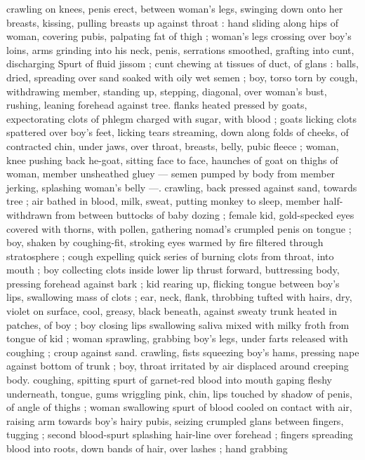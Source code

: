 crawling on knees, penis erect, between woman's legs, swinging
down onto her breasts, kissing, pulling breasts up against throat :
hand sliding along hips of woman, covering pubis, palpating fat of
thigh ; woman's legs crossing over boy's loins, arms grinding into his
neck, penis, serrations smoothed, grafting into cunt, discharging
Spurt of fluid jissom ; cunt chewing at tissues of duct, of glans :
balls, dried, spreading over sand soaked with oily wet semen ; boy,
torso torn by cough, withdrawing member, standing up, stepping,
diagonal, over woman's bust, rushing, leaning forehead against tree.
flanks heated pressed by goats, expectorating clots of phlegm
charged with sugar, with blood ; goats licking clots spattered over
boy's feet, licking tears streaming, down along folds of cheeks, of
contracted chin, under jaws, over throat, breasts, belly, pubic fleece
; woman, knee pushing back he-goat, sitting face to face, haunches
of goat on thighs of woman, member unsheathed gluey --- semen
pumped by body from member jerking, splashing woman's belly ---.
crawling, back pressed against sand, towards tree ; air bathed in
blood, milk, sweat, putting monkey to sleep, member half-withdrawn
from between buttocks of baby dozing ; female kid, gold-specked
eyes covered with thorns, with pollen, gathering nomad’s crumpled
penis on tongue ; boy, shaken by coughing-fit, stroking eyes warmed
by fire filtered through stratosphere ; cough expelling quick series of
burning clots from throat, into mouth ; boy collecting clots inside
lower lip thrust forward, buttressing body, pressing forehead against
bark ; kid rearing up, flicking tongue between boy's lips, swallowing
mass of clots ; ear, neck, flank, throbbing tufted with hairs, dry, violet
on surface, cool, greasy, black beneath, against sweaty trunk heated
in patches, of boy ; boy closing lips swallowing saliva mixed with
milky froth from tongue of kid ; woman sprawling, grabbing boy's
legs, under farts released with coughing ; croup against sand.
crawling, fists squeezing boy's hams, pressing nape against bottom
of trunk ; boy, throat irritated by air displaced around creeping body.
coughing, spitting spurt of garnet-red blood into mouth gaping
fleshy underneath, tongue, gums wriggling pink, chin, lips touched
by shadow of penis, of angle of thighs ; woman swallowing spurt of
blood cooled on contact with air, raising arm towards boy's hairy
pubis, seizing crumpled glans between fingers, tugging ; second
blood-spurt splashing hair-line over forehead ; fingers spreading
blood into roots, down bands of hair, over lashes ; hand grabbing
